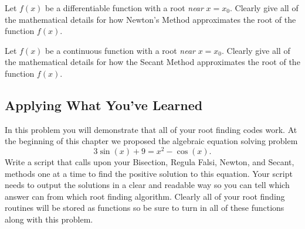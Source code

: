 \begin{problem}
    Let $f(x)$ be a differentiable function with a root {\it near} $x=x_0$.  Clearly give
    all of the mathematical details for how Newton's Method approximates the root of the
    function $f(x)$.
\end{problem}

\begin{problem}
    Let $f(x)$ be a continuous function with a root {\it near} $x=x_0$.  Clearly give
    all of the mathematical details for how the Secant Method approximates the root of the
    function $f(x)$.
\end{problem}

\subsection{Applying What You've Learned}

\begin{problem}
    In this problem you will demonstrate that all of your root finding codes work.
    At the beginning of this chapter we proposed the algebraic equation solving problem
    \[ 3\sin(x) + 9 = x^2 - \cos(x). \]
    Write a \ProgLang script that calls upon your Bisection, Regula Falsi, Newton, and
    Secant, methods one at a time to find the positive solution to this equation.  Your
    script needs to output the solutions in a clear and readable way so you can tell which
    answer can from which root finding algorithm. Clearly all of your root finding
    routines will be stored as \ProgLang functions so be sure to turn in all of these
    functions along with this problem.
\end{problem}

